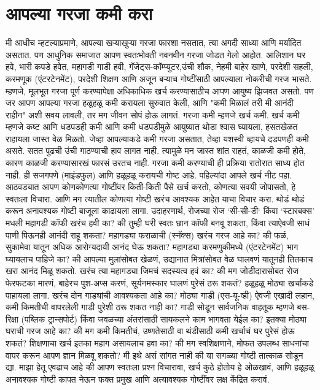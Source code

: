  \chapter{आपल्या गरजा कमी करा}
मी आधीच म्हटल्याप्रमाणे, आपल्या खऱ्याखुऱ्या गरजा फारशा नसतात, त्या अगदी साध्या आणि मर्यादित असतात. पण आधुनिक समाजात आपण स्वतःभोवती नवनवीन गरजा जोडत गेलो आहोत. आलिशान घर हवे, भारी कपडे हवेत, महागडी गाडी हवी, गॅजेट्स-कॉम्प्युटर,उंची शौक, नेहमी बाहेर खाणे, परदेशी सहली, करमणूक (एंटरटेनमेंट), परदेशी शिक्षण आणि अजून बऱ्याच गोष्टींसाठी आपल्याला नोकरीची गरज भासते. म्हणजे, मूलभूत गरजा पूर्ण करण्यापेक्षा अधिकाधिक खर्च करण्यासाठीच आपण आयुष्य झिजवत असतो.
पण जर आपण आपल्या गरजा हळूहळू कमी करायला सुरुवात केली, आणि "कमी मिळालं तरी मी आनंदी राहीन" अशी सवय लावली, तर मग जीवन सोपं होऊ लागतं. गरजा कमी म्हणजे खर्च कमी. खर्च कमी म्हणजे कष्ट आणि धडपडही कमी आणि कमी धडपडीमुळे आयुष्यात थोडा श्वास घ्यायला, हसतखेळत राहायला जास्त वेळ मिळतो.
जेव्हा आपल्याकडे कमी गरजा असतात, तेव्हा यशस्वी व्हायचे दडपणही कमी असते. सतत पुढची उंची गाठण्याची हाव लागत नाही. त्यामुळे मन जास्त शांत राहतं, काळजी कमी होते, कारण काळजी करण्यासारखं फारसं उरतच नाही.
गरजा कमी करण्याची ही प्रक्रिया रातोरात साध्य होत नाही. ही सजगपणे (माइंडफुल) आणि हळूहळू करायची गोष्ट आहे. पहिल्यांदा आपले खर्च नीट पहा. आठवड्यात आपण कोणकोणत्या गोष्टींवर किती-किती पैसे खर्च करतो, कोणत्या सवयी जोपासतो, हे स्वतःला विचारा. आणि मग त्यातील कोणत्या गोष्टी खरंच आवश्यक आहेत याचा विचार करा.
थोडं थोडं करून अनावश्यक गोष्टी बाजूला काढायला लागा. उदाहरणार्थ, रोजच्या रोज ‘सी-सी-डी‘ किंवा ‘स्टारबक्स’ मधली महागडी कॉफी खरंच हवी का? की तुम्ही घरी स्वतः छान कॉफी बनवू शकता, किंवा त्याऐवजी साधं पाणी पिऊनही आनंदी राहू शकता? महागड्या फराळाची (स्नॅक्स) खरंच गरज आहे का? की फळं, सुकामेवा यातून अधिक आरोग्यदायी आनंद घेऊ शकता? महागड्या करमणुकीमध्ये (एंटरटेनमेंट) भाग घ्यायलाच पाहिजे का? की आपल्या मुलांसोबत खेळणं, उद्यानात मित्रांसोबत वेळ घालवणं यातूनही तितकाच खरा आनंद मिळू शकतो. खरंच त्या महागड्या जिमचं सदस्यत्व हवं का? की मग जोडीदारासोबत रोज फेरफटका मारणं, बाहेरच पुश-अप्स करणं, सूर्यनमस्कार घालणं पुरेसं ठरू शकतं?
हळूहळू मोठ्या खर्चांकडे पाहायला लागा. खरंच दोन गाड्यांची आवश्यकता आहे का? मोठ्या गाडी (एस-यू-व्ही) ऐवजी एखादी लहान, कमी किमतीची वापरलेली गाडी पुरेशी ठरू शकत नाही का? गाडी सोडून सार्वजनिक वाहतूक म्हणजे बस-रिक्षा (पब्लिक ट्रान्सपोर्ट) किंवा जवळच्या अंतरांसाठी सायकलने काम भागवता येईल का? इतक्या मोठ्या घराची गरज आहे का? की मग कमी किमतीचं, उष्णतेसाठी वा थंडीसाठी कमी खर्चाचं घर पुरेसं होऊ शकतं? शिक्षणाचा खर्च इतका महाग असायलाच हवा का? की मग स्वशिक्षणाने, मोफत उपलब्ध साधनांचा वापर करून आपण ज्ञान मिळवू शकतो?
मी इथे असं सांगत नाही की या सगळ्या गोष्टी तात्काळ सोडून द्या. माझा हेतू एवढाच आहे की आपण स्वतःला प्रश्न विचारावा, खर्च कुठे होतोय हे ओळखावं, आणि हळूहळू अनावश्यक गोष्टी कापत नेऊन फक्त प्रमुख आणि अत्यावश्यक गोष्टींवर लक्ष केंद्रित करावं.
